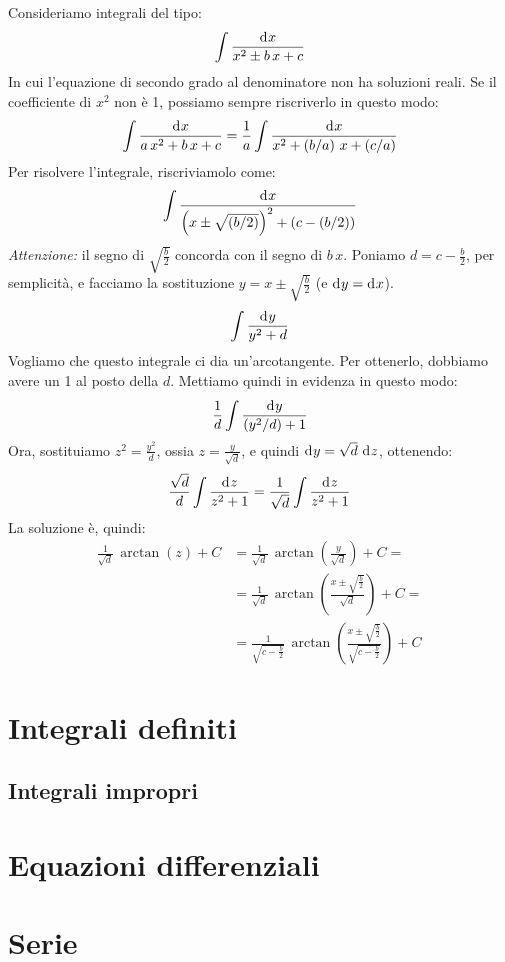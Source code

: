 Consideriamo integrali del tipo:
\[
\int \frac{\diff x}{x^2 \pm b \, x + c}
\]
In cui l'equazione di secondo grado al denominatore non ha soluzioni reali.
Se il coefficiente di $x^2$ non \`e 1, possiamo sempre riscriverlo in questo
modo:
\[
\int \frac{\diff x}{a \, x^2 + b \, x + c} = 
\frac{1}{a} \int \frac{\diff x}{x^2 + \frac{b}{a} \, x + \frac{c}{a}}
\]
Per risolvere l'integrale, riscriviamolo come:
\[
\int \frac{\diff x}{\left( x \pm \sqrt{\frac{b}{2}} \right)^2 + 
\left( c - \frac{b}{2} \right)}
\]
\emph{Attenzione:} il segno di $\sqrt{\frac{b}{2}}$ concorda con il segno 
di $b \, x$.
Poniamo $d = c - \frac{b}{2}$, per semplicit\`a, e facciamo la 
sostituzione $y = x \pm \sqrt{\frac{b}{2}}$ (e $\diff y = \diff x$).
\[
\int \frac{\diff y}{y^2 + d}
\]
Vogliamo che questo integrale ci dia un'arcotangente. Per ottenerlo, dobbiamo
avere un 1 al posto della $d$. Mettiamo quindi in evidenza in questo modo:
\[
\frac{1}{d} \int \frac{\diff y}{\frac{y^2}{d} + 1}
\]
Ora, sostituiamo $z^2 = \frac{y^2}{d}$, ossia $z = \frac{y}{\sqrt{d}}$, 
e quindi $\diff y = \sqrt{d} \dx[z]$, ottenendo:
\[
\frac{\sqrt{d}}{d} \int \frac{\diff z}{z^2 + 1} =
\frac{1}{\sqrt{d}} \int \frac{\diff z}{z^2 + 1}
\]
La soluzione \`e, quindi:
\begin{align*}
\frac{1}{\sqrt{d}} \, \arctan \left( z \right) + C &=
\frac{1}{\sqrt{d}} \, \arctan \left( \frac{y}{\sqrt{d}} \right) + C = \\
&= \frac{1}{\sqrt{d}} \, \arctan \left( \frac{x \pm \sqrt{\frac{b}{2}}}{\sqrt{d}} \right) + C = \\
&= \frac{1}{\sqrt{c - \frac{b}{2}}} \, \arctan \left( \frac{x \pm \sqrt{\frac{b}{2}}}{\sqrt{c - \frac{b}{2}}} \right) + C
\end{align*}


\chapter{Integrali definiti}

\section{Integrali impropri}

\chapter{Equazioni differenziali}

\chapter{Serie}

